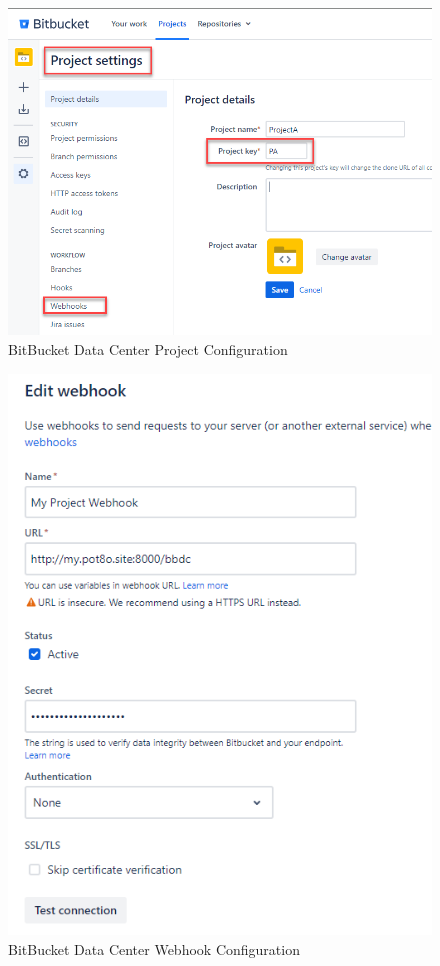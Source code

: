 \begin{figure}[h]
    \includegraphics[width=\textwidth]{graphics/bbdc-project-config.png}
    \caption{BitBucket Data Center Project Configuration}
    \label{fig:bbdc-project-config}
\end{figure}

\begin{figure}[h]
    \includegraphics[width=\textwidth]{graphics/bbdc-webhook-config.png}
    \caption{BitBucket Data Center Webhook Configuration}
    \label{fig:bbdc-webhook-config}
\end{figure}



